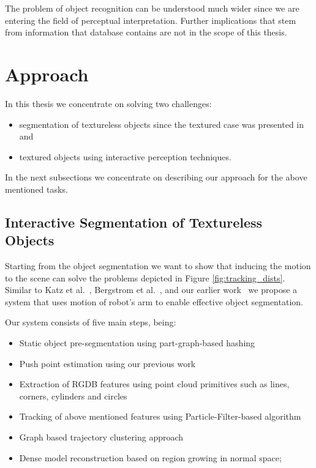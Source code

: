 The problem of object recognition can be understood much wider since we are entering the field of perceptual interpretation. Further implications that stem from information that database contains are not in the scope of this thesis.



\section{Approach} 

In this thesis we concentrate on solving two challenges: 

\begin{itemize} 
\item segmentation of textureless objects since the textured case was presented in~\cite{bersch12interactive} and~\cite{Katz-WS-MM-ICRA2011}

\item textured objects using interactive perception techniques.
\end{itemize} 

In the next subsections we concentrate on describing our approach for the above mentioned tasks.

\subsection{Interactive Segmentation of Textureless Objects} 


Starting from the object segmentation 
 we want to show that inducing the motion to the scene can solve the problems depicted in Figure \ref{fig:tracking_dists}. Similar  to Katz  et al.~\cite{Katz-WS-MM-ICRA2011}, Bergstrom et
al.~\cite{bergstrom11icvs}, and our earlier
work~\cite{bersch12interactive} we propose a system that uses
motion of robot's arm to enable effective
object  segmentation.

Our system consists of five main steps, being:

\begin{itemize} 
\item Static object pre-segmentation using part-graph-based hashing ~\cite{marton12SC}
\item Push point estimation using our previous work ~\cite{bersch12interactive}
\item Extraction of RGDB features using point cloud primitives such as lines, corners, cylinders and circles
\item Tracking of above mentioned features using Particle-Filter-based algorithm
\item Graph based trajectory clustering approach
\item Dense model reconstruction based on region growing in normal space;
\end{itemize} 


